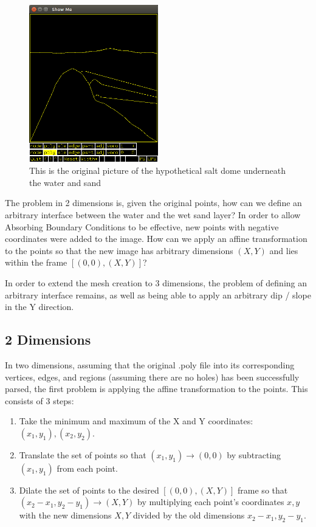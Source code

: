 \begin{figure}[H]
\centering
\includegraphics[width=0.5\textwidth]{Images/Original-Couches5.png}
\caption{This is the original picture of the hypothetical salt dome underneath the water and sand}
\label{fig:originalCouches5}
\end{figure}

The problem in 2 dimensions is, given the original points, how can we define an arbitrary interface between the water and the wet sand layer? In order to allow Absorbing Boundary Conditions to be effective, new points with negative coordinates were added to the image. How can we apply an affine transformation to the points so that the new image has arbitrary dimensions $(X,Y)$ and lies within the frame $[(0,0),(X,Y)]$? 

In order to extend the mesh creation to 3 dimensions, the problem of defining an arbitrary interface remains, as well as being able to apply an arbitrary dip / slope in the Y direction. 



\subsection{2 Dimensions}

In two dimensions, assuming that the original .poly file into its corresponding vertices, edges, and regions (assuming there are no holes) has been successfully parsed, the first problem is applying the affine transformation to the points. This consists of 3 steps:

\begin{enumerate}
\item Take the minimum and maximum of the X and Y coordinates: $(x_1, y_1), (x_2, y_2)$.
\item Translate the set of points so that $(x_1,y_1) \rightarrow (0,0)$ by subtracting $(x_1,y_1)$ from each point.
\item Dilate the set of points to the desired $[(0,0),(X,Y)]$ frame so that $(x_2 - x_1, y_2 - y_1) \rightarrow (X,Y)$ by multiplying each point's coordinates $x,y$ with the new dimensions $X,Y$ divided by the old dimensions $x_2 - x_1, y_2 - y_1$.
\end{enumerate}

